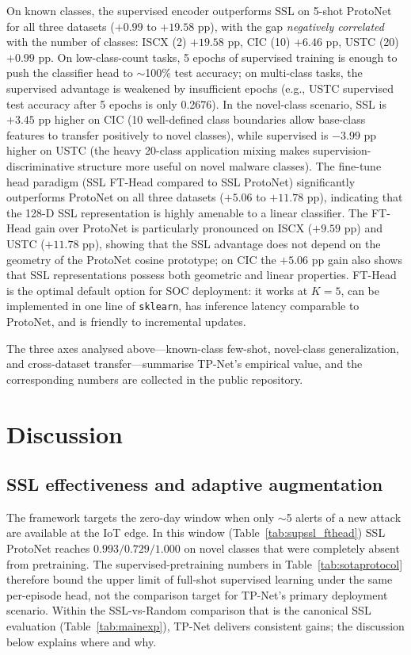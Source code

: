 \documentclass[sensors,article,submit,moreauthors]{Definitions/mdpi}
\begin{document}
On known classes, the supervised encoder outperforms SSL on 5-shot ProtoNet for all three datasets ($+0.99$ to $+19.58$ pp), with the gap \emph{negatively correlated} with the number of classes: ISCX (2) $+19.58$ pp, CIC (10) $+6.46$ pp, USTC (20) $+0.99$ pp. On low-class-count tasks, 5 epochs of supervised training is enough to push the classifier head to $\sim$100\% test accuracy; on multi-class tasks, the supervised advantage is weakened by insufficient epochs (e.g., USTC supervised test accuracy after 5 epochs is only 0.2676). In the novel-class scenario, SSL is $+3.45$ pp higher on CIC (10 well-defined class boundaries allow base-class features to transfer positively to novel classes), while supervised is $-3.99$ pp higher on USTC (the heavy 20-class application mixing makes supervision-discriminative structure more useful on novel malware classes). The fine-tune head paradigm (SSL FT-Head compared to SSL ProtoNet) significantly outperforms ProtoNet on all three datasets ($+5.06$ to $+11.78$ pp), indicating that the 128-D SSL representation is highly amenable to a linear classifier. The FT-Head gain over ProtoNet is particularly pronounced on ISCX ($+9.59$ pp) and USTC ($+11.78$ pp), showing that the SSL advantage does not depend on the geometry of the ProtoNet cosine prototype; on CIC the $+5.06$ pp gain also shows that SSL representations possess both geometric and linear properties. FT-Head is the optimal default option for SOC deployment: it works at $K = 5$, can be implemented in one line of \texttt{sklearn}, has inference latency comparable to ProtoNet, and is friendly to incremental updates.

The three axes analysed above---known-class few-shot, novel-class generalization, and cross-dataset transfer---summarise TP-Net's empirical value, and the corresponding numbers are collected in the public repository.

\section{Discussion}
\label{sec:discussion}

\subsection{SSL effectiveness and adaptive augmentation}

The framework targets the zero-day window when only $\sim$5 alerts of a new attack are available at the IoT edge. In this window (Table~\ref{tab:supssl_fthead}) SSL ProtoNet reaches $0.993/0.729/1.000$ on novel classes that were completely absent from pretraining. The supervised-pretraining numbers in Table~\ref{tab:sotaprotocol} therefore bound the upper limit of full-shot supervised learning under the same per-episode head, not the comparison target for TP-Net's primary deployment scenario. Within the SSL-vs-Random comparison that is the canonical SSL evaluation (Table~\ref{tab:mainexp}), TP-Net delivers consistent gains; the discussion below explains where and why.
\end{document}
